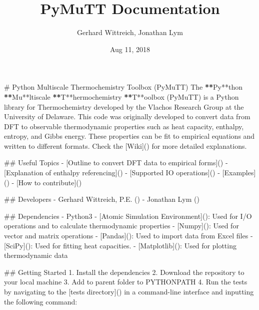 \documentclass[letterpaper,10pt,english]{sphinxmanual}
\title{PyMuTT Documentation}
\date{Aug 11, 2018}
\author{Gerhard Wittreich, Jonathan Lym}
\begin{document}
\maketitle
\sphinxtableofcontents
{}\label{\detokenize{index::doc}}


\# Python Multiscale Thermochemistry Toolbox (PyMuTT)
The {\color{red}\bfseries{}**}Py**thon {\color{red}\bfseries{}**}Mu**ltiscale {\color{red}\bfseries{}**}T**hermochemistry {\color{red}\bfseries{}**}T**oolbox (PyMuTT) is a Python library for Thermochemistry developed by the Vlachos Research Group at the University of Delaware. This code was originally developed to convert  data from DFT to observable thermodynamic properties such as heat capacity, enthalpy, entropy, and Gibbs energy. These properties can be fit to empirical equations and written to different formats. Check the {[}Wiki{]}() for more detailed explanations.

\#\# Useful Topics
- {[}Outline to convert DFT data to empirical forms{]}()
- {[}Explanation of enthalpy referencing{]}()
- {[}Supported IO operations{]}()
- {[}Examples{]}()
- {[}How to contribute{]}()

\#\# Developers
- Gerhard Wittreich, P.E. ()
- Jonathan Lym ()

\#\# Dependencies
- Python3
- {[}Atomic Simulation Environment{]}(): Used for I/O operations and to calculate thermodynamic properties
- {[}Numpy{]}(): Used for vector and matrix operations
- {[}Pandas{]}(): Used to import data from Excel files
- {[}SciPy{]}(): Used for fitting heat capacities.
- {[}Matplotlib{]}(): Used for plotting thermodynamic data

\#\# Getting Started
1. Install the dependencies
2. Download the repository to your local machine
3. Add to parent folder to PYTHONPATH
4. Run the tests by navigating to the {[}tests directory{]}() in a command-line interface and inputting the following command:
\end{document}
